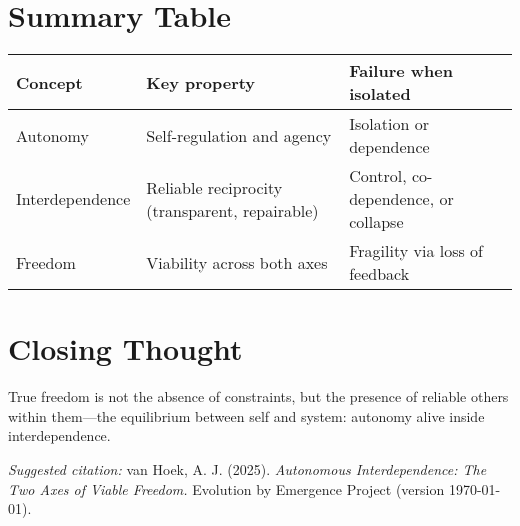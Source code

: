 \documentclass[11pt,a4paper]{article}
\begin{document}
\section{Summary Table}
\begin{center}
\begin{tabular}{|l|p{6cm}|p{6cm}|}
\hline
\textbf{Concept} & \textbf{Key property} & \textbf{Failure when isolated} \\ \hline
Autonomy & Self-regulation and agency & Isolation or dependence \\ \hline
Interdependence & Reliable reciprocity (transparent, repairable) & Control, co-dependence, or collapse \\ \hline
Freedom & Viability across both axes & Fragility via loss of feedback \\ \hline
\end{tabular}
\end{center}

\section{Closing Thought}
True freedom is not the absence of constraints, but the presence of reliable others within them---the equilibrium between self and system: autonomy alive inside interdependence.

\vspace{1em}
\noindent\textit{Suggested citation:} van Hoek, A. J. (2025). \emph{Autonomous Interdependence: The Two Axes of Viable Freedom.} Evolution by Emergence Project (version \today).
\end{document}
